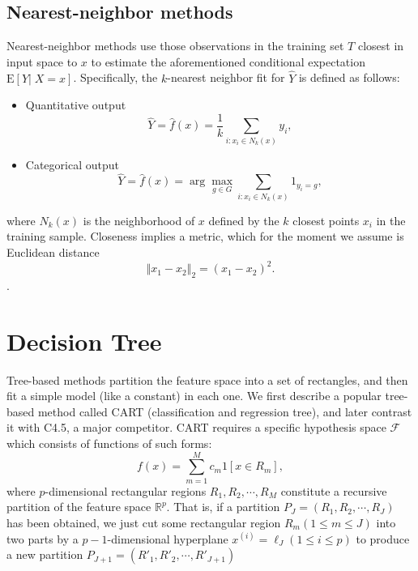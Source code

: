 \documentclass{report}
\theoremstyle{nonumberplain}
\newcommand{\0}{\mathbf{0}}
\begin{document}
\section{Nearest-neighbor methods}
Nearest-neighbor methods use those observations in the training set $T$ closest in input space to $x$ to estimate the aforementioned conditional expectation  $\mathrm{E}[Y|\; X=x]$. Specifically, the $k$-nearest neighbor fit for $\hat{Y}$ is defined as follows:
\begin{itemize}
	\item Quantitative output
	\[
	\hat{Y}=\hat{f}(x)=\dfrac{1}{k}\sum_{i:x_i\in N_k(x)}y_i,
	\]
	\item Categorical output
	\[
	\hat{Y}=\hat{f}(x)=\arg\max_{g\in G}\sum_{i:x_i\in N_k(x)}1_{y_i=g},
	\]
\end{itemize}
where $N_k(x)$ is the neighborhood of $x$ defined by the $k$ closest points $x_i$ in the training sample. Closeness implies a metric, which for the moment we assume is Euclidean distance 
\[
\Vert x_1-x_2\Vert_2=(x_1-x_2)^2.
\].


\chapter{Decision Tree}
Tree-based methods partition the feature space into a set of rectangles, and
then fit a simple model (like a constant) in each one. We first describe a popular tree-based method called CART (classification and regression tree), and later contrast it with C4.5, a major competitor. CART requires a specific hypothesis space $\mathcal{F}$ which consists of functions of such forms:
\[
f(x)=\sum_{m=1}^{M} c_{m} 1\left[x \in R_{m}\right],
\]
where $p$-dimensional rectangular regions $R_1,R_2,\cdots,R_M$ constitute a recursive partition of the feature space $\mathbb{R}^p$. That is, if a partition $P_J=(R_1,R_2,\cdots,R_J)$ has been obtained, we just cut some rectangular region $R_m(1\le m\le J)$ into two parts by a $p-1$-dimensional hyperplane $x^{(i)}=\ell_J(1\le i\le p)$ to produce a new partition $P_{J+1}=(R'_1,R'_2,\cdots,R'_{J+1})$
\end{document}
